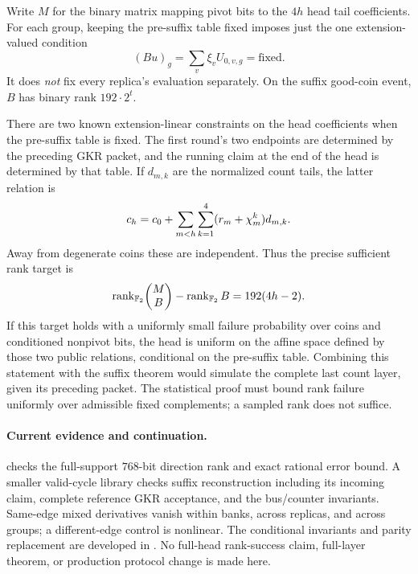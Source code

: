 Write $M$ for the binary matrix mapping pivot bits to the $4h$ head tail coefficients. For each group, keeping the pre-suffix table fixed imposes just the one extension-valued condition
\[
 (Bu)_g=\sum_v\xi_vU_{0,v,g}=\text{fixed}.
\]
It does \emph{not} fix every replica's evaluation separately. On the suffix good-coin event, $B$ has binary rank $192\cdot2^t$.

There are two known extension-linear constraints on the head coefficients when the pre-suffix table is fixed. The first round's two endpoints are determined by the preceding GKR packet, and the running claim at the end of the head is determined by that table. If $d_{m,k}$ are the normalized count tails, the latter relation is
\[
 c_h=c_0+\sum_{m<h}\sum_{k=1}^4(r_m+\chi_m^k)d_{m,k}.
\]
Away from degenerate coins these are independent. Thus the precise sufficient rank target is
\[
 \operatorname{rank}_{\mathbb{F}_2}\!\begin{pmatrix}M\\B\end{pmatrix}
 -\operatorname{rank}_{\mathbb{F}_2}B
 =192(4h-2).
\]
If this target holds with a uniformly small failure probability over coins and conditioned nonpivot bits, the head is uniform on the affine space defined by those two public relations, conditional on the pre-suffix table. Combining this statement with the suffix theorem would simulate the complete last count layer, given its preceding packet. The statistical proof must bound rank failure uniformly over admissible fixed complements; a sampled rank does not suffice.

\paragraph{Current evidence and continuation.}  checks the full-support $768$-bit direction rank and exact rational error bound. A smaller valid-cycle library checks suffix reconstruction including its incoming claim, complete reference GKR acceptance, and the bus/counter invariants. Same-edge mixed derivatives vanish within banks, across replicas, and across groups; a different-edge control is nonlinear. The conditional invariants and parity replacement are developed in . No full-head rank-success claim, full-layer theorem, or production protocol change is made here.
